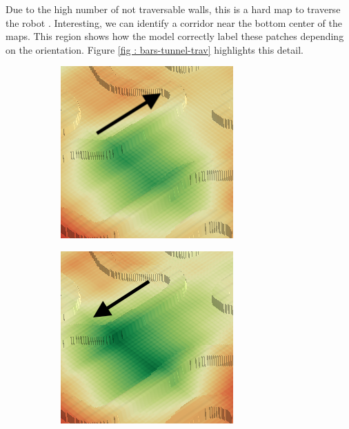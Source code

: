 \documentclass[../document.tex]{subfiles}
\begin{document}
Due to the high number of not traversable walls, this is a hard map to traverse the robot . Interesting, we can identify a corridor near the bottom center of the maps. This region shows how the model correctly label these patches depending on the orientation. Figure \ref{fig : bars-tunnel-trav} highlights this detail.

\begin{figure} [htbp]
  \centering
  \begin{subfigure}[b]{0.23\textwidth}
    \includegraphics[width=\linewidth]{../img/4/traversability/bars/tunnel/-270-crop.png} 
  \end{subfigure}
  \begin{subfigure}[b]{0.23\textwidth}
      \includegraphics[width=\linewidth]{../img/4/traversability/bars/tunnel/-90-crop.png}

\end{subfigure}
\end{figure}
\end{document}
